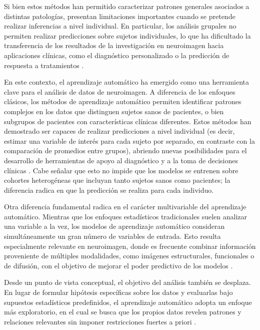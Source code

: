 Si bien estos métodos han permitido caracterizar patrones generales asociados a distintas patologías, presentan limitaciones importantes cuando se pretende realizar inferencias a nivel individual. En particular, los análisis grupales no permiten realizar predicciones sobre sujetos individuales, lo que ha dificultado la transferencia de los resultados de la investigación en neuroimagen hacia aplicaciones clínicas, como el diagnóstico personalizado o la predicción de respuesta a tratamientos \cite{mwangi2014review}.

En este contexto, el aprendizaje automático ha emergido como una herramienta clave para el análisis de datos de neuroimagen. A diferencia de los enfoques clásicos, los métodos de aprendizaje automático permiten identificar patrones complejos en los datos que distinguen sujetos sanos de pacientes, o bien subgrupos de pacientes con características clínicas diferentes. Estos métodos han demostrado ser capaces de realizar predicciones a nivel individual (es decir, estimar una variable de interés para cada sujeto por separado, en contraste con la comparación de promedios entre grupos), abriendo nuevas posibilidades para el desarrollo de herramientas de apoyo al diagnóstico y a la toma de decisiones clínicas \cite{vieira2020introduction}. Cabe señalar que esto no impide que los modelos se entrenen sobre cohortes heterogéneas que incluyan tanto sujetos sanos como pacientes; la diferencia radica en que la predicción se realiza para cada individuo.

Otra diferencia fundamental radica en el carácter multivariable del aprendizaje automático. Mientras que los enfoques estadísticos tradicionales suelen analizar una variable a la vez, los modelos de aprendizaje automático consideran simultáneamente un gran número de variables de entrada. Esto resulta especialmente relevante en neuroimagen, donde es frecuente combinar información proveniente de múltiples modalidades, como imágenes estructurales, funcionales o de difusión, con el objetivo de mejorar el poder predictivo de los modelos \cite{mwangi2014review}.

Desde un punto de vista conceptual, el objetivo del análisis también se desplaza. En lugar de formular hipótesis específicas sobre los datos y evaluarlas bajo supuestos estadísticos predefinidos, el aprendizaje automático adopta un enfoque más exploratorio, en el cual se busca que los propios datos revelen patrones y relaciones relevantes sin imponer restricciones fuertes a priori \cite{vieira2020introduction}.

